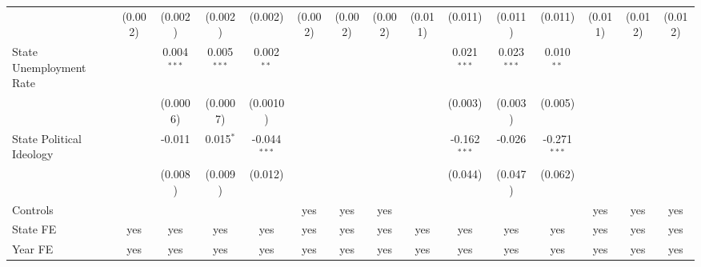 \documentclass[
]{article}
\begin{document}
\begin{table}[htbp]
\begin{adjustbox}{width = 1.5\textwidth, center}
\begin{threeparttable}[b]
\begin{tabular}{lcccccccccccccc}
                                                      & (0.002)        & (0.002)        & (0.002)        & (0.002)        & (0.002)        & (0.002)        & (0.002)        & (0.011)        & (0.011)        & (0.011)        & (0.011)        & (0.011)        & (0.012)        & (0.012)\\   
            State Unemployment Rate                   &                & 0.004$^{***}$  & 0.005$^{***}$  & 0.002$^{**}$   &                &                &                &                & 0.021$^{***}$  & 0.023$^{***}$  & 0.010$^{**}$   &                &                &   \\   
                                                      &                & (0.0006)       & (0.0007)       & (0.0010)       &                &                &                &                & (0.003)        & (0.003)        & (0.005)        &                &                &   \\   
            State Political Ideology                  &                & -0.011         & 0.015$^{*}$    & -0.044$^{***}$ &                &                &                &                & -0.162$^{***}$ & -0.026         & -0.271$^{***}$ &                &                &   \\   
                                                      &                & (0.008)        & (0.009)        & (0.012)        &                &                &                &                & (0.044)        & (0.047)        & (0.062)        &                &                &   \\   
            \midrule 
            Controls                                  &                &                &                &                & yes            & yes            & yes            &                &                &                &                & yes            & yes            & yes\\  
            State FE                                  & yes            & yes            & yes            & yes            & yes            & yes            & yes            & yes            & yes            & yes            & yes            & yes            & yes            & yes\\  
            Year FE                                   & yes            & yes            & yes            & yes            & yes            & yes            & yes            & yes            & yes            & yes            & yes            & yes            & yes            & yes\\  

\end{tabular}
\end{threeparttable}
\end{adjustbox}
\end{table}
\end{document}
